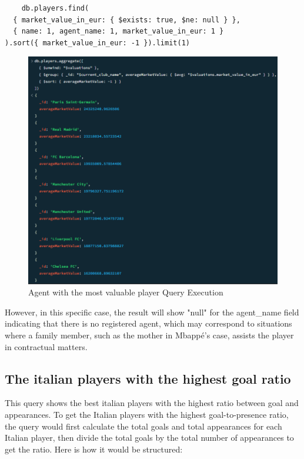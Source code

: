 \documentclass{Configuration_Files/PoliMi3i_thesis}
\begin{document}
\begin{verbatim}
    db.players.find(
  { market_value_in_eur: { $exists: true, $ne: null } },
  { name: 1, agent_name: 1, market_value_in_eur: 1 }
).sort({ market_value_in_eur: -1 }).limit(1)
\end{verbatim}

\begin{figure}[htbp]
    \centering
    \includegraphics[scale=1]{Images/Queries/Average_market_value_club/amvc.png}
    \caption{Agent with the most valuable player Query Execution}
\end{figure}
However, in this specific case, the result will show "null" for the agent\_name field indicating that there is no registered agent, which may correspond to situations where a family member, such as the mother in Mbappé's case, assists the player in contractual matters.

\subsection{The italian players with the highest goal ratio}

This query shows the best italian players with the highest ratio between goal and appearances.
To get the Italian players with the highest goal-to-presence ratio, the query would first calculate the total goals and total appearances for each Italian player, then divide the total goals by the total number of appearances to get the ratio. Here is how it would be structured:
\end{document}
